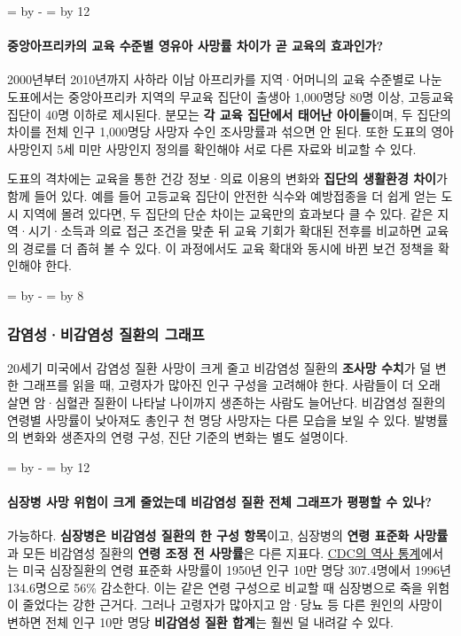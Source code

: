 \documentclass[10pt,a4paper]{article}
\newcommand{\ReserveQuestionSpace}{%
  \par\begingroup
  \dimen0=\pagegoal \advance\dimen0 by -\pagetotal
  \dimen2=\baselineskip \multiply\dimen2 by 12
  \ifdim\dimen0<\dimen2 \newpage\fi
  \endgroup}
\newcommand{\ReserveReadingSectionSpace}{%
  \par\begingroup
  \dimen0=\pagegoal \advance\dimen0 by -\pagetotal
  \dimen2=\baselineskip \multiply\dimen2 by 8
  \ifdim\dimen0<\dimen2 \newpage\fi
  \endgroup}
\begin{document}
\ReserveQuestionSpace
\paragraph{중앙아프리카의 교육 수준별 영유아 사망률 차이가 곧 교육의 효과인가?}
2000년부터 2010년까지 사하라 이남 아프리카를 지역·어머니의 교육 수준별로 나눈 도표에서는 중앙아프리카 지역의 무교육 집단이 출생아 1,000명당 80명 이상, 고등교육 집단이 40명 이하로 제시된다. 분모는 \textbf{각 교육 집단에서 태어난 아이들}이며, 두 집단의 차이를 전체 인구 1,000명당 사망자 수인 조사망률과 섞으면 안 된다. 또한 도표의 영아 사망인지 5세 미만 사망인지 정의를 확인해야 서로 다른 자료와 비교할 수 있다.\par

도표의 격차에는 교육을 통한 건강 정보·의료 이용의 변화와 \textbf{집단의 생활환경 차이}가 함께 들어 있다. 예를 들어 고등교육 집단이 안전한 식수와 예방접종을 더 쉽게 얻는 도시 지역에 몰려 있다면, 두 집단의 단순 차이는 교육만의 효과보다 클 수 있다. 같은 지역·시기·소득과 의료 접근 조건을 맞춘 뒤 교육 기회가 확대된 전후를 비교하면 교육의 경로를 더 좁혀 볼 수 있다. 이 과정에서도 교육 확대와 동시에 바뀐 보건 정책을 확인해야 한다.\par

\ReserveReadingSectionSpace
\subsubsection*{감염성·비감염성 질환의 그래프}

20세기 미국에서 감염성 질환 사망이 크게 줄고 비감염성 질환의 \textbf{조사망 수치}가 덜 변한 그래프를 읽을 때, 고령자가 많아진 인구 구성을 고려해야 한다. 사람들이 더 오래 살면 암·심혈관 질환이 나타날 나이까지 생존하는 사람도 늘어난다. 비감염성 질환의 연령별 사망률이 낮아져도 총인구 천 명당 사망자는 다른 모습을 보일 수 있다. 발병률의 변화와 생존자의 연령 구성, 진단 기준의 변화는 별도 설명이다.\par

\ReserveQuestionSpace
\paragraph{심장병 사망 위험이 크게 줄었는데 비감염성 질환 전체 그래프가 평평할 수 있나?}
가능하다. \textbf{심장병은 비감염성 질환의 한 구성 항목}이고, 심장병의 \textbf{연령 표준화 사망률}과 모든 비감염성 질환의 \textbf{연령 조정 전 사망률}은 다른 지표다. \href{https://www.cdc.gov/mmwr/preview/mmwrhtml/mm4830a1.htm}{CDC의 역사 통계}에서는 미국 심장질환의 연령 표준화 사망률이 1950년 인구 10만 명당 307.4명에서 1996년 134.6명으로 56\% 감소한다. 이는 같은 연령 구성으로 비교할 때 심장병으로 죽을 위험이 줄었다는 강한 근거다. 그러나 고령자가 많아지고 암·당뇨 등 다른 원인의 사망이 변하면 전체 인구 10만 명당 \textbf{비감염성 질환 합계}는 훨씬 덜 내려갈 수 있다.\par
\end{document}
